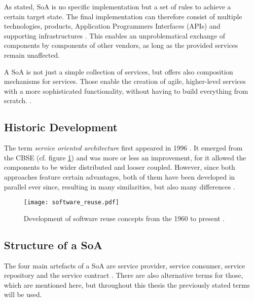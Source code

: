 As stated, SoA is no specific implementation but a set of rules to achieve a certain target state. The final implementation can therefore consist of multiple technologies, products, Application Programmers Interfaces (APIs) and supporting infrastructures \cite[p.29]{erl2011}. This enables an unproblematical exchange of components by components of other vendors, as long as the provided services remain unaffected.

A SoA is not just a simple collection of services, but offers also composition mechanisms for services. Those enable the creation of agile, higher-level services with a more sophisticated functionality, without having to build everything from scratch. \cite[p.12]{josuttis}.



\subsection{Historic Development}
The term \emph{service oriented architecture} first appeared in 1996 \cite[p.7]{rosen}. It emerged from the CBSE (cf. figure \ref{fig:software_reuse}) and was more or less an improvement, for it allowed the components to be wider distributed and looser coupled. However, since both approaches feature certain advantages, both of them have been developed in parallel ever since, resulting in many similarities, but also many differences \cite{breivold}. 


\begin{figure}[!htbp]
\centering
\texttt{[image: software\_reuse.pdf]}
\caption{Development of software reuse concepts from the 1960 to present \cite{clements}.}
\label{fig:software_reuse}
\end{figure}


\subsection{Structure of a SoA}
\label{sec:structure_of_soa}
The four main artefacts of a SoA are service provider, service consumer, service repository and the service contract \cite{arrowhead} \cite{breivold} \cite{rodrigues2011}. There are also alternative terms for those, which are mentioned here, but throughout this thesis the previously stated terms will be used.

